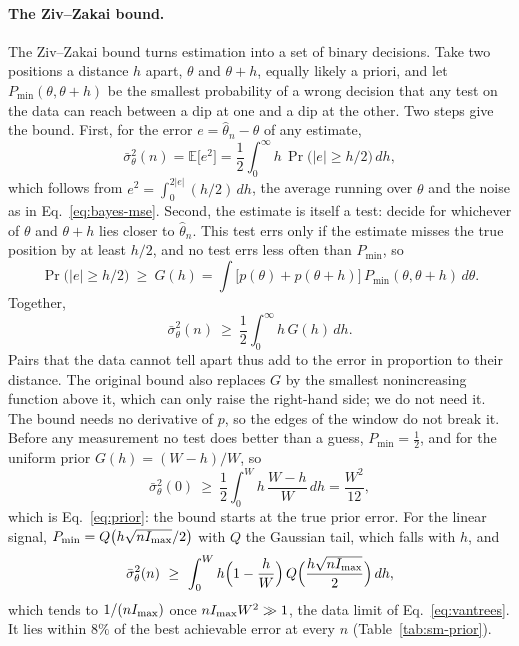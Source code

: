 \paragraph{The Ziv--Zakai bound.} The Ziv--Zakai bound \cite{zivzakai1969,bell1997} turns estimation into a set of
binary decisions. Take two positions a distance $h$ apart, $\theta$ and $\theta+h$, equally likely a priori, and let
$P_{\min}(\theta,\theta+h)$ be the smallest probability of a wrong decision that any test on the data can reach
between a dip at one and a dip at the other. Two steps give the bound. First, for the error $e=\hat\theta_n-\theta$
of any estimate,
\begin{equation*}
  \bar\sigma_\theta^2(n)=\mathbb E\big[e^2\big]=\frac12\int_0^\infty h\,\Pr\big(|e|\ge h/2\big)\,dh ,
\end{equation*}
which follows from $e^2=\int_0^{2|e|}(h/2)\,dh$, the average running over $\theta$ and the noise as in
Eq.~\eqref{eq:bayes-mse}. Second, the estimate is itself a test: decide for whichever of $\theta$ and $\theta+h$ lies
closer to $\hat\theta_n$. This test errs only if the estimate misses the true position by at least $h/2$, and no test
errs less often than $P_{\min}$, so
\begin{equation*}
  \Pr\big(|e|\ge h/2\big)\ \ge\ G(h)=\int\big[p(\theta)+p(\theta+h)\big]\,P_{\min}(\theta,\theta+h)\,d\theta .
\end{equation*}
Together,
\begin{equation}
  \bar\sigma_\theta^2(n)\ \ge\ \frac12\int_0^\infty h\,G(h)\,dh .
  \label{eq:sm-zz}
\end{equation}
Pairs that the data cannot tell apart thus add to the error in proportion to their distance. The original bound
also replaces $G$ by the smallest nonincreasing function above it, which can only raise the right-hand side; we do
not need it. The bound needs no derivative of $p$, so the edges of the window do not break it. Before any
measurement no test does better than a guess, $P_{\min}=\tfrac12$, and for the uniform prior $G(h)=(W-h)/W$, so
\begin{equation*}
  \bar\sigma_\theta^2(0)\ \ge\ \frac12\int_0^W h\,\frac{W-h}{W}\,dh=\frac{W^2}{12},
\end{equation*}
which is Eq.~\eqref{eq:prior}: the bound starts at the true prior error. For the linear signal,
$P_{\min}=Q\big(h\sqrt{nI_{\rm max}}/2\big)$ with $Q$ the Gaussian tail, which falls with $h$, and
\begin{equation}
  \bar\sigma_\theta^2(n)\ \ge\ \int_0^W h\Big(1-\frac hW\Big)\,Q\Big(\frac{h\sqrt{nI_{\rm max}}}{2}\Big)\,dh ,
  \label{eq:sm-zz-linear}
\end{equation}
which tends to $1/(nI_{\rm max})$ once $nI_{\rm max}W^2\gg1$, the data limit of Eq.~\eqref{eq:vantrees}. It lies within $8\%$ of the best achievable error at every $n$
(Table~\ref{tab:sm-prior}).

